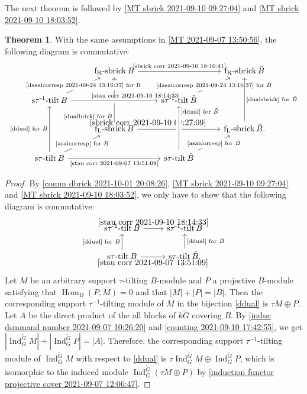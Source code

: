 \documentclass[pdftex,a4paper]{article}
\numberwithin{equation}{subsection}
\theoremstyle{definition}
\newtheorem{theorem}{Theorem}[section]
\newcommand{\Hom}{\operatorname{Hom}\nolimits}
\newcommand{\induc}{{\operatorname{Ind}\nolimits}}
\newcommand{\stautilt}{\operatorname{\mathrm{s\tau-tilt}}}
\newcommand{\stauitilt}{\operatorname{\mathrm{s\tau^{-1}-tilt}}}
\newcommand{\flsbrick}{\operatorname{\mathrm{f_L-sbrick}}}
\newcommand{\frsbrick}{\operatorname{\mathrm{f_R-sbrick}}}
\begin{document}
The next theorem is followed by \cref{MT sbrick 2021-09-10 09:27:04} and \cref{MT sbrick 2021-09-10 18:03:52}.

\begin{theorem} With the same assumptions in \cref{MT 2021-09-07 13:50:56}, the following diagram is commutative:
	\begin{equation}
		\begin{tikzcd}
			&\frsbrick B\ar[dd,leftarrow,"\text{\eqref{dualbrick} for \(B\)}"'very near end]  \ar[rr,"\text{\eqref{sbrick corr 2021-09-10 18:10:41}}"]&&\frsbrick \tilde{B}\\
			\stauitilt B\ar[ru,"\text{\eqref{dasaicorresp 2021-09-24 13:16:37} for B}"description] \ar[rr,"\text{\eqref{stau corr 2021-09-10 18:14:33}}"near end,crossing over]&&\stauitilt \tilde{B}\ar[ru,"\text{\eqref{dasaicorresp 2021-09-24 13:16:37} for \(\tilde{B}\)}"description] \\
			&\flsbrick B\ar[rr,"\eqref{sbrick corr 2021-09-10 09:27:09}"very near start]&&\flsbrick \tilde{B}\ar[uu,"\text{\eqref{dualsbrick} for \(\tilde{B}\)}"'].\\
			\stautilt B\ar[ru,"\text{\eqref{asaicorresp} for \(B\)}"description] \ar[uu,"\text{\eqref{ddual} for \(B\)}"] \ar[rr,"\text{\eqref{stau corr 2021-09-07 13:51:09}}"'] &&\stautilt \tilde{B} \ar[ru,"\text{\eqref{asaicorresp} for \(\tilde{B}\)}"description] \ar[uu,"\text{\eqref{ddual} for \(\tilde{B}\)}"'very near end,crossing over]
		\end{tikzcd}
	\end{equation}
\end{theorem}
\begin{proof}
	By \cref{comm dbrick 2021-10-01 20:08:26}, \cref{MT sbrick 2021-09-10 09:27:04} and \cref{MT sbrick 2021-09-10 18:03:52}, we only have to show that the following diagram is commutative:
	\begin{equation}
		\begin{tikzcd}
			\stauitilt B\ar[r,"\eqref{stau corr 2021-09-10 18:14:33}"]&\stauitilt \tilde{B}\\
			\stautilt B\ar[u,"\text{\eqref{ddual} for \(B\)}"] \ar[r,"\eqref{stau corr 2021-09-07 13:51:09}"']&\stautilt \tilde{B}\ar[u,"\text{\eqref{ddual} for \(\tilde{B}\)}"'].
		\end{tikzcd}
	\end{equation}
	Let \(M\) be an arbitrary support \(\tau\)-tilting \(B\)-module  and \(P\) a projective \(B\)-module satisfying that \(\Hom_B(P,M)=0\) and that \(|M|+|P|=|B|\).
	Then the corresponding support \(\tau^{-1}\)-tilting module of \(M\) in the bijection \eqref{ddual} is \(\tau M\oplus P\).
	Let \(A\) be the direct product of the all blocks of \(k\tilde{G}\) covering \(B\).
	By \cref{induc dsmmand number 2021-09-07 10:26:20} and \cref{counting 2021-09-10 17:42:55}, we get \(|\induc_G^{\tilde{G}} M|+|\induc_G^{\tilde{G}} P|=|A|\).
	Therefore, the corresponding support \(\tau^{-1}\)-tilting module of \(\induc_G^{\tilde{G}} M\) with respect to \eqref{ddual} is \(\tau \induc_G^{\tilde{G}}M\oplus \induc_G^{\tilde{G}} P\), which is isomorphic to the induced module \(\induc_G^{\tilde{G}}(\tau M\oplus P)\) by \cref{induction functor projective cover 2021-09-07 12:06:47}.
\end{proof}
\end{document}
